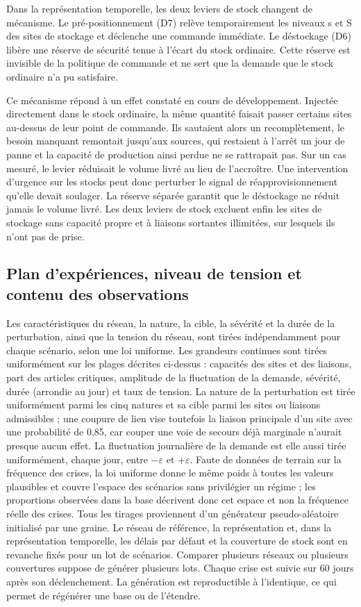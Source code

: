 Dans la représentation temporelle, les deux leviers de stock changent de mécanisme. Le pré-positionnement (D7) relève temporairement les niveaux s et S des sites de stockage et déclenche une commande immédiate. Le déstockage (D6) libère une réserve de sécurité tenue à l'écart du stock ordinaire. Cette réserve est invisible de la politique de commande et ne sert que la demande que le stock ordinaire n'a pu satisfaire.

Ce mécanisme répond à un effet constaté en cours de développement. Injectée directement dans le stock ordinaire, la même quantité faisait passer certains sites au-dessus de leur point de commande. Ils sautaient alors un recomplètement, le besoin manquant remontait jusqu'aux sources, qui restaient à l'arrêt un jour de panne et la capacité de production ainsi perdue ne se rattrapait pas. Sur un cas mesuré, le levier réduisait le volume livré au lieu de l'accroître. Une intervention d'urgence sur les stocks peut donc perturber le signal de réapprovisionnement qu'elle devait soulager. La réserve séparée garantit que le déstockage ne réduit jamais le volume livré. Les deux leviers de stock excluent enfin les sites de stockage sans capacité propre et à liaisons sortantes illimitées, sur lesquels ils n'ont pas de prise.

\subsection{Plan d'expériences, niveau de tension et contenu des observations}
\label{sec:S3.5}

Les caractéristiques du réseau, la nature, la cible, la sévérité et la durée de la perturbation, ainsi que la tension du réseau, sont tirées indépendamment pour chaque scénario, selon une loi uniforme. Les grandeurs continues sont tirées uniformément sur les plages décrites ci-dessus : capacités des sites et des liaisons, part des articles critiques, amplitude de la fluctuation de la demande, sévérité, durée (arrondie au jour) et taux de tension. La nature de la perturbation est tirée uniformément parmi les cinq natures et sa cible parmi les sites ou liaisons admissibles ; une coupure de lien vise toutefois la liaison principale d'un site avec une probabilité de 0,85, car couper une voie de secours déjà marginale n'aurait presque aucun effet. La fluctuation journalière de la demande est elle aussi tirée uniformément, chaque jour, entre $-\varepsilon$ et $+\varepsilon$. Faute de données de terrain sur la fréquence des crises, la loi uniforme donne le même poids à toutes les valeurs plausibles et couvre l'espace des scénarios sans privilégier un régime ; les proportions observées dans la base décrivent donc cet espace et non la fréquence réelle des crises. Tous les tirages proviennent d'un générateur pseudo-aléatoire initialisé par une graine. Le réseau de référence, la représentation et, dans la représentation temporelle, les délais par défaut et la couverture de stock sont en revanche fixés pour un lot de scénarios. Comparer plusieurs réseaux ou plusieurs couvertures suppose de générer plusieurs lots. Chaque crise est suivie sur 60 jours après son déclenchement. La génération est reproductible à l'identique, ce qui permet de régénérer une base ou de l'étendre.

